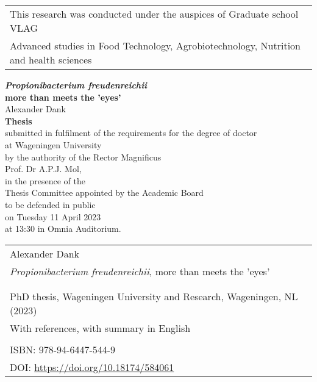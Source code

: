\begin{tabular}{l}
    \small{This research was conducted under the auspices of Graduate school VLAG} 		\\  
    \small{Advanced studies in Food Technology, Agrobiotechnology, Nutrition and health sciences}                         \\  
\end{tabular}

\newpage
\thispagestyle{empty}
\begin{center}
\Huge{\textbf{\textit{Propionibacterium freudenreichii}}} \\
\Huge{\textbf{more than meets the 'eyes'}} \\
\vspace*{1cm}
\Large{Alexander Dank}\\
\normalsize
\vspace*{\fill}
\textbf{Thesis} \\
submitted in fulfilment of the requirements for the degree of doctor  \\
at Wageningen University\\
by the authority of the Rector Magnificus\\
Prof. Dr A.P.J. Mol,\\
in the presence of the\\
Thesis Committee appointed by the Academic Board\\
to be defended in public\\
on Tuesday 11 April 2023\\
at 13:30 in Omnia Auditorium.\\
\end{center}

\newpage
\thispagestyle{empty}
\vspace*{\fill}
\begin{flushleft}
\begin{tabular}{l}
    Alexander Dank                                                 \\  
    \textit{Propionibacterium freudenreichii}, more than meets the 'eyes'    \\  
                       \\  
                                                             \\  
    PhD thesis, Wageningen University and Research, Wageningen, NL (2023) \\  
    With references, with summary in English                 \\  
                                                             \\  
    ISBN:  978-94-6447-544-9      \\    
    DOI: \url{https://doi.org/10.18174/584061} \\  
\end{tabular}
\end{flushleft}


%